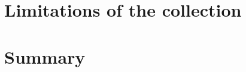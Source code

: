 %
\newpage
%
 

\section{Limitations of the collection}
\label{sec:measurement:robust}
%


%
\newpage
%
 

\section{Summary}


%
